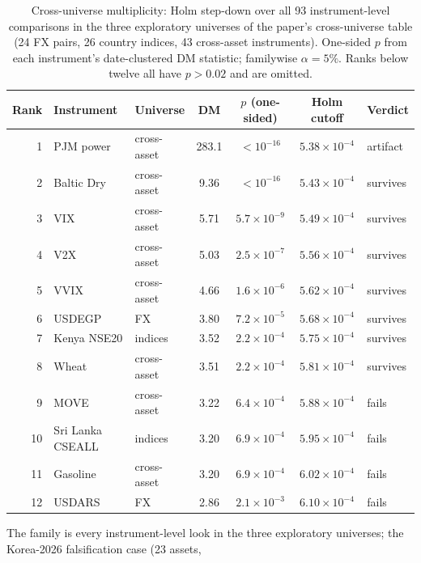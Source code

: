 \documentclass[11pt]{article}
\begin{document}
\begin{table}[htbp]
\centering
\begin{threeparttable}
\caption{Cross-universe multiplicity: Holm step-down over all 93
instrument-level comparisons in the three exploratory universes of the
paper's cross-universe table (24 FX pairs, 26 country indices, 43
cross-asset instruments). One-sided $p$ from each instrument's date-clustered DM
statistic; familywise $\alpha=5\%$. Ranks below twelve all have
$p>0.02$ and are omitted.}
\label{tab:holm}
\footnotesize\setlength{\tabcolsep}{5pt}
\begin{tabular}{rllcccl}
\toprule
Rank & Instrument & Universe & DM & $p$ (one-sided) & Holm cutoff & Verdict \\
\midrule
1 & PJM power\tnote{a} & cross-asset & 283.1 & $<10^{-16}$ & $5.38\times10^{-4}$ & artifact\tnote{a} \\
2 & Baltic Dry & cross-asset & 9.36 & $<10^{-16}$ & $5.43\times10^{-4}$ & survives \\
3 & VIX & cross-asset & 5.71 & $5.7\times10^{-9}$ & $5.49\times10^{-4}$ & survives \\
4 & V2X & cross-asset & 5.03 & $2.5\times10^{-7}$ & $5.56\times10^{-4}$ & survives \\
5 & VVIX & cross-asset & 4.66 & $1.6\times10^{-6}$ & $5.62\times10^{-4}$ & survives \\
6 & USDEGP & FX & 3.80 & $7.2\times10^{-5}$ & $5.68\times10^{-4}$ & survives \\
7 & Kenya NSE20 & indices & 3.52 & $2.2\times10^{-4}$ & $5.75\times10^{-4}$ & survives \\
8 & Wheat & cross-asset & 3.51 & $2.2\times10^{-4}$ & $5.81\times10^{-4}$ & survives \\
9 & MOVE & cross-asset & 3.22 & $6.4\times10^{-4}$ & $5.88\times10^{-4}$ & fails \\
10 & Sri Lanka CSEALL & indices & 3.20 & $6.9\times10^{-4}$ & $5.95\times10^{-4}$ & fails \\
11 & Gasoline & cross-asset & 3.20 & $6.9\times10^{-4}$ & $6.02\times10^{-4}$ & fails \\
12 & USDARS & FX & 2.86 & $2.1\times10^{-3}$ & $6.10\times10^{-4}$ & fails \\
\bottomrule
\end{tabular}
\begin{tablenotes}\footnotesize
\item The family is every instrument-level look in the three
exploratory universes; the Korea-2026 falsification case (23 assets,

\end{tablenotes}
\end{threeparttable}
\end{table}
\end{document}

